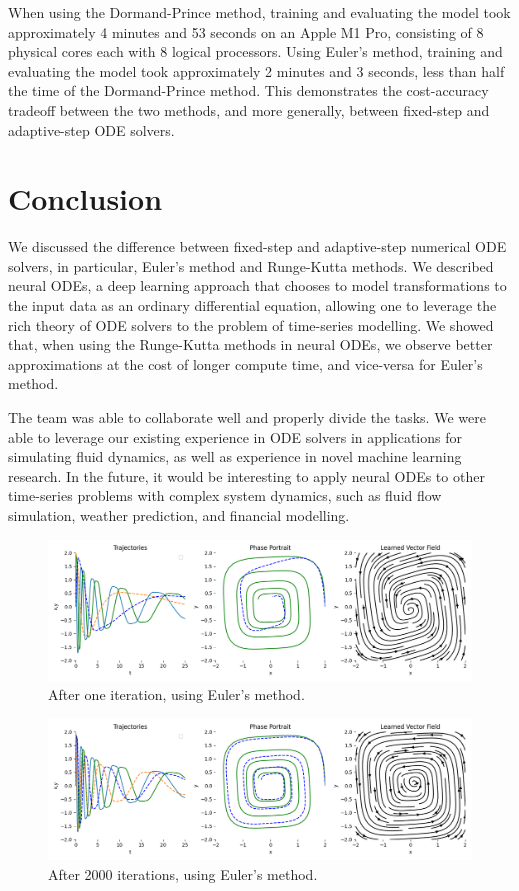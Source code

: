 \documentclass[11pt]{article}
\begin{document}
When using the Dormand-Prince method, training and evaluating the model took approximately 4 minutes and 53 seconds on an Apple M1 Pro, consisting of 8 physical cores each with 8 logical processors. Using Euler's method, training and evaluating the model took approximately 2 minutes and 3 seconds, less than half the time of the Dormand-Prince method. This demonstrates the cost-accuracy tradeoff between the two methods, and more generally, between fixed-step and adaptive-step ODE solvers.

\section{Conclusion}

We discussed the difference between fixed-step and adaptive-step numerical ODE solvers, in particular, Euler's method and Runge-Kutta methods. We described neural ODEs, a deep learning approach that chooses to model transformations to the input data as an ordinary differential equation, allowing one to leverage the rich theory of ODE solvers to the problem of time-series modelling. We showed that, when using the Runge-Kutta methods in neural ODEs, we observe better approximations at the cost of longer compute time, and vice-versa for Euler's method.

The team was able to collaborate well and properly divide the tasks. We were able to leverage our existing experience in ODE solvers in applications for simulating fluid dynamics, as well as experience in novel machine learning research. In the future, it would be interesting to apply neural ODEs to other time-series problems with complex system dynamics, such as fluid flow simulation, weather prediction, and financial modelling.


\begin{figure}
  \centering
  \includegraphics*[width=\linewidth]{000_euler.png}
  \caption{After one iteration, using Euler's method.}
  \label{fig:first_iteration_euler}
\end{figure}

\begin{figure}
  \centering
  \includegraphics*[width=\linewidth]{099_euler.png}
  \caption{After 2000 iterations, using Euler's method.}
  \label{fig:last_iteration_euler}
\end{figure}
\end{document}
